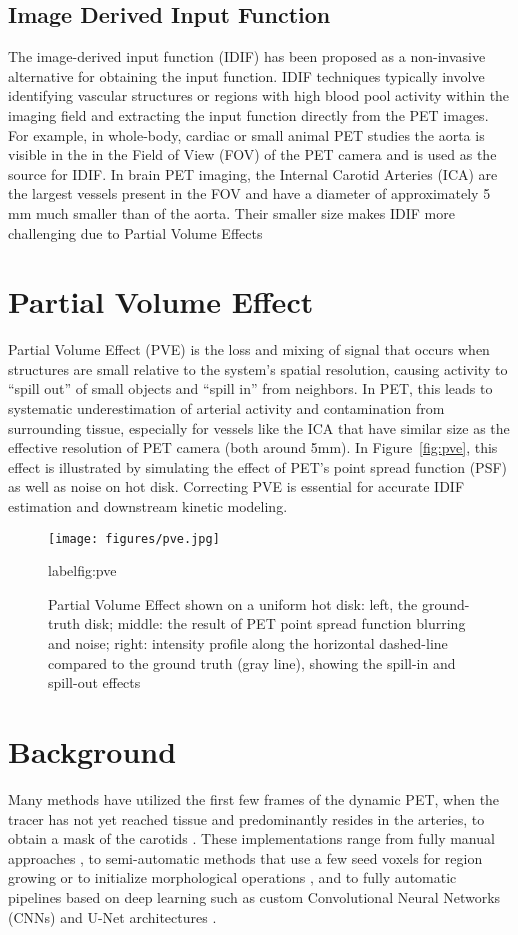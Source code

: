 \subsection{Image Derived Input Function}
The image-derived input function (IDIF) has been proposed as a non-invasive alternative for obtaining the input function.
IDIF techniques typically involve identifying vascular structures or regions with high blood pool activity within the imaging field and extracting the input function directly from the PET images.
For example, in whole-body, cardiac or small animal PET studies the aorta is visible in the in the Field of View (FOV) of the PET camera and is used as the source for IDIF.
In brain PET imaging, the Internal Carotid Arteries (ICA) are the largest vessels present in the FOV and have a diameter of approximately 5 mm much smaller than of the aorta.
Their smaller size makes IDIF more challenging due to Partial Volume Effects

\section{Partial Volume Effect}
Partial Volume Effect (PVE) is the loss and mixing of signal that occurs when structures are small relative to the system’s spatial resolution, causing activity to “spill out” of small objects and “spill in” from neighbors.
In PET, this leads to systematic underestimation of arterial activity and contamination from surrounding tissue, especially for vessels like the ICA that have similar size as the effective resolution of PET camera (both around 5mm).
In Figure~\ref{fig:pve}, this effect is illustrated by simulating the effect of PET's point spread function (PSF) as well as noise on hot disk.
Correcting PVE is essential for accurate IDIF estimation and downstream kinetic modeling.

\begin{figure}[h]
	\texttt{[image: figures/pve.jpg]}
	\caption{Partial Volume Effect shown on a uniform hot disk: left, the ground-truth disk; middle: the result of PET point spread function blurring and noise; right: intensity profile along the horizontal dashed-line compared to the ground truth (gray line), showing the spill-in and spill-out effects}
	label{fig:pve}
\end{figure}
\section{Background}
Many methods have utilized the first few frames of the dynamic PET, when the tracer has not yet reached tissue and predominantly resides in the arteries, to obtain a mask of the carotids \cite{young2023image}.
These implementations range from fully manual approaches \cite{feng2015image}, to semi-automatic methods that use a few seed voxels for region growing or to initialize morphological operations \cite{dassanayake2022caliper,vestergaard2021validation}, and to fully automatic pipelines based on deep learning such as custom Convolutional Neural Networks (CNNs) \cite{ferrante2024physically,chen2025deep} and U-Net architectures \cite{chavan2024end}.

